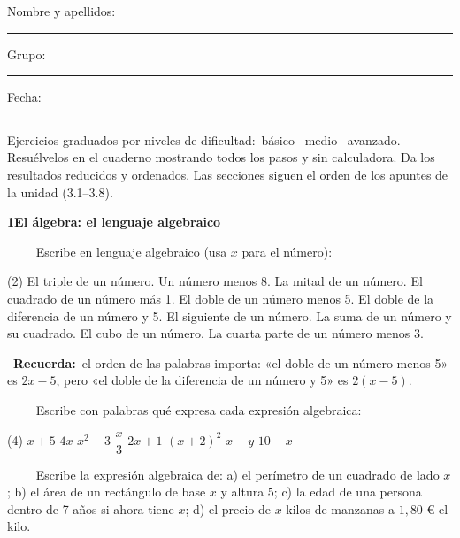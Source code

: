 \documentclass[11pt,a4paper]{article}
\newcommand{\estrelles}[1]{{\color{accent}\ifcase#1\or\faStar\faStar[regular]\faStar[regular]\or\faStar\faStar\faStar[regular]\or\faStar\faStar\faStar\fi}}
\newcounter{exer}
\newcommand{\ex}[1]{\par\needspace{4\baselineskip}\medskip\stepcounter{exer}\noindent{\color{navy}\bfseries\theexer.}\ \ {\small\estrelles{#1}}\ \ }
\newcommand{\seccio}[2]{\par\needspace{10\baselineskip}\bigskip
  \begin{tcolorbox}[colback=navy,colframe=navy,coltext=white,arc=2mm,boxrule=0pt,left=3mm,right=3mm,top=1.2mm,bottom=1.2mm]
  {\large\bfseries #1\quad #2}
  \end{tcolorbox}\vspace{-2pt}}
\newcommand{\recorda}[1]{\par\smallskip\begin{tcolorbox}[colback=accent!7,colframe=accent!55,arc=2mm,boxrule=0.5pt,left=2.5mm,right=2.5mm,top=1mm,bottom=1mm]\small{\color{accent}\faLightbulb[regular]}\ \textbf{Recuerda:}\ #1\end{tcolorbox}}
\begin{document}
\thispagestyle{primera}

\vspace{10pt}
Nombre y apellidos: \rule{6.6cm}{0.4pt}\hfill Grupo: \rule{1.6cm}{0.4pt}\hfill Fecha: \rule{2.2cm}{0.4pt}
\vspace{8pt}

\begin{tcolorbox}[colback=soft,colframe=soft,arc=2mm,left=3mm,right=3mm,top=1.5mm,bottom=1.5mm]
\small Ejercicios graduados por niveles de dificultad:\quad \estrelles{1}\ básico \qquad \estrelles{2}\ medio \qquad \estrelles{3}\ avanzado.\\[2pt] Resuélvelos en el cuaderno mostrando todos los pasos y sin calculadora. Da los resultados reducidos y ordenados. Las secciones siguen el orden de los apuntes de la unidad (3.1--3.8).
\end{tcolorbox}

\seccio{1}{El álgebra: el lenguaje algebraico}

\ex{1} Escribe en lenguaje algebraico (usa $x$ para el número):\begin{tasks}[after-item-skip=3pt](2)
  \task El triple de un número.
  \task Un número menos 8.
  \task La mitad de un número.
  \task El cuadrado de un número más 1.
  \task El doble de un número menos 5.
  \task El doble de la diferencia de un número y 5.
  \task El siguiente de un número.
  \task La suma de un número y su cuadrado.
  \task El cubo de un número.
  \task La cuarta parte de un número menos 3.
\end{tasks}\recorda{el orden de las palabras importa: «el doble de un número menos 5» es $2x-5$, pero «el doble de la diferencia de un número y 5» es $2(x-5)$.}

\ex{1} Escribe con palabras qué expresa cada expresión algebraica:\begin{tasks}(4)
  \task $x+5$
  \task $4x$
  \task $x^2-3$
  \task $\dfrac{x}{3}$
  \task $2x+1$
  \task $(x+2)^2$
  \task $x-y$
  \task $10-x$
\end{tasks}

\ex{1} Escribe la expresión algebraica de: a) el perímetro de un cuadrado de lado $x$; b) el área de un rectángulo de base $x$ y altura $5$; c) la edad de una persona dentro de 7 años si ahora tiene $x$; d) el precio de $x$ kilos de manzanas a $1{,}80$ € el kilo.
\end{document}
